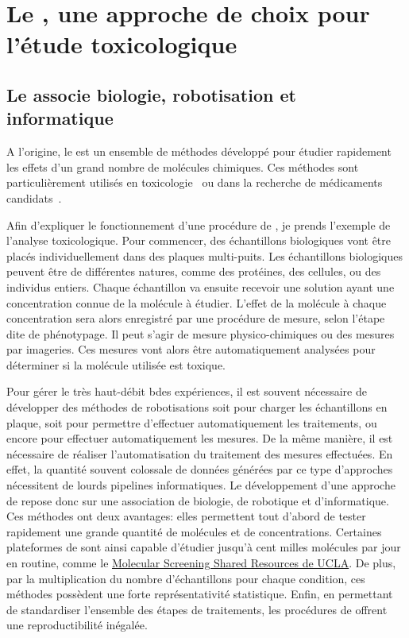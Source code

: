 \documentclass[\main/main.tex]{subfiles}
\begin{document}
            
\section{Le \hcs{}, une approche de choix pour l'étude toxicologique}

    \subsection{Le \hcs{} associe biologie, robotisation et informatique}
    
%
A l'origine, le \hcs{} est un ensemble de méthodes développé pour étudier rapidement les effets d'un grand nombre de molécules chimiques.
%
Ces méthodes sont particulièrement utilisés en toxicologie~\cite{na_2016} ou dans la recherche de médicaments candidats~\cite{macarron_2011}.

%
Afin d'expliquer le fonctionnement d'une procédure de \hcs{}, je prends l'exemple de l'analyse toxicologique.
%
Pour commencer, des échantillons biologiques vont être placés individuellement dans des plaques multi-puits.
%
Les échantillons biologiques peuvent être de différentes natures, comme des protéines, des cellules, ou des individus entiers.
Chaque échantillon va ensuite recevoir une solution ayant une concentration connue de la molécule à étudier.
%
L'effet de la molécule à chaque concentration sera alors enregistré par une procédure de mesure, selon l'étape dite de phénotypage.
%
Il peut s'agir de mesure physico-chimiques ou des mesures par imageries.
%
Ces mesures vont alors être automatiquement analysées pour déterminer si la molécule utilisée est toxique.

%
Pour gérer le très haut-débit bdes expériences, il est souvent nécessaire de développer des méthodes de robotisations soit pour charger les échantillons en plaque, soit pour permettre d'effectuer automatiquement les traitements, ou encore pour effectuer automatiquement les mesures.
%
De la même manière, il est nécessaire de réaliser l'automatisation du traitement des mesures effectuées.
%
En effet, la quantité souvent colossale de données générées par ce type d'approches nécessitent de lourds pipelines informatiques.
%
Le développement d'une approche de \hcs{} repose donc sur une association de biologie, de robotique et d'informatique.
%
Ces méthodes ont deux avantages:
%
elles permettent tout d'abord de tester rapidement une grande quantité de molécules et de concentrations.
%
Certaines plateformes de \hcs{} sont ainsi capable d'étudier jusqu'à cent milles molécules par jour en routine,
comme le \href{https://www.mssr.ucla.edu/}{Molecular Screening Shared Resources de UCLA}.
%
De plus, par la multiplication du nombre d'échantillons pour chaque condition, ces méthodes possèdent une forte représentativité statistique.
%
Enfin, en permettant de standardiser l'ensemble des étapes de traitements, les procédures de \hcs{} offrent une reproductibilité inégalée.
\end{document}
